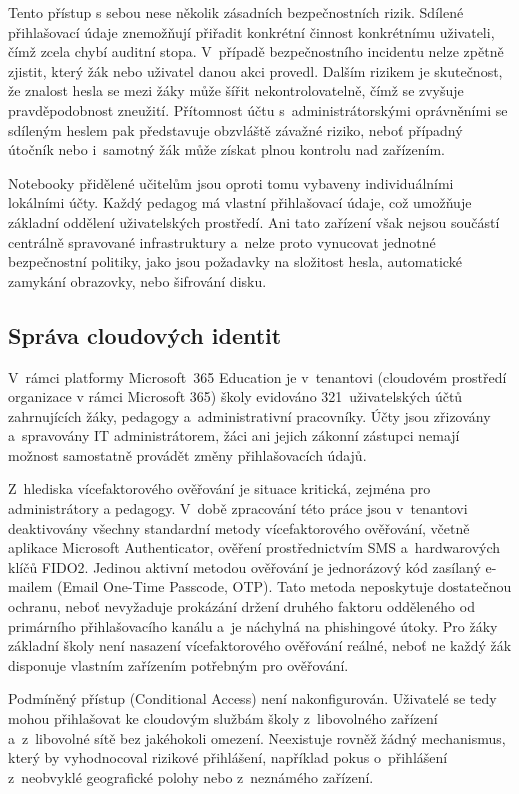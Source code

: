 \documentclass[male,czech,api_bc]{kitheses}
\begin{document}
Tento přístup s sebou nese několik zásadních bezpečnostních rizik. Sdílené 
přihlašovací údaje znemožňují přiřadit konkrétní činnost konkrétnímu uživateli, 
čímž zcela chybí auditní stopa. V~případě bezpečnostního incidentu nelze 
zpětně zjistit, který žák nebo uživatel danou akci provedl. Dalším rizikem 
je skutečnost, že znalost hesla se mezi žáky může šířit nekontrolovatelně, čímž 
se zvyšuje pravděpodobnost zneužití. Přítomnost účtu s~administrátorskými 
oprávněními se sdíleným heslem pak představuje obzvláště závažné riziko, 
neboť případný útočník nebo i~samotný žák může získat plnou kontrolu nad zařízením.

Notebooky přidělené učitelům jsou oproti tomu vybaveny individuálními lokálními 
účty. Každý pedagog má vlastní přihlašovací údaje, což umožňuje základní 
oddělení uživatelských prostředí. Ani tato zařízení však nejsou součástí 
centrálně spravované infrastruktury a~nelze proto vynucovat jednotné 
bezpečnostní politiky, jako jsou požadavky na složitost hesla, automatické 
zamykání obrazovky, nebo šifrování disku.

\subsection{Správa cloudových identit}

V~rámci platformy Microsoft~365 Education je v~tenantovi (cloudovém prostředí organizace v rámci Microsoft 365) školy evidováno 
321~uživatelských účtů zahrnujících žáky, pedagogy a~administrativní 
pracovníky. Účty jsou zřizovány a~spravovány IT administrátorem, žáci 
ani jejich zákonní zástupci nemají možnost samostatně provádět změny 
přihlašovacích údajů.

Z~hlediska vícefaktorového ověřování je situace kritická, zejména pro administrátory a pedagogy. V~době zpracování 
této práce jsou v~tenantovi deaktivovány všechny standardní metody 
vícefaktorového ověřování, včetně aplikace Microsoft Authenticator, 
ověření prostřednictvím SMS a~hardwarových klíčů FIDO2. Jedinou aktivní 
metodou ověřování je jednorázový kód zasílaný e-mailem (Email One-Time 
Passcode, OTP). Tato metoda neposkytuje dostatečnou ochranu, neboť nevyžaduje 
prokázání držení druhého faktoru odděleného od primárního přihlašovacího 
kanálu a~je náchylná na phishingové útoky.
Pro žáky základní školy není nasazení vícefaktorového ověřování reálné, neboť ne každý žák disponuje vlastním zařízením potřebným pro ověřování.

Podmíněný přístup (Conditional Access) není nakonfigurován. Uživatelé se 
tedy mohou přihlašovat ke cloudovým službám školy z~libovolného zařízení 
a~z~libovolné sítě bez jakéhokoli omezení. Neexistuje rovněž žádný mechanismus, 
který by vyhodnocoval rizikové přihlášení, například pokus o~přihlášení 
z~neobvyklé geografické polohy nebo z~neznámého zařízení.
\end{document}

